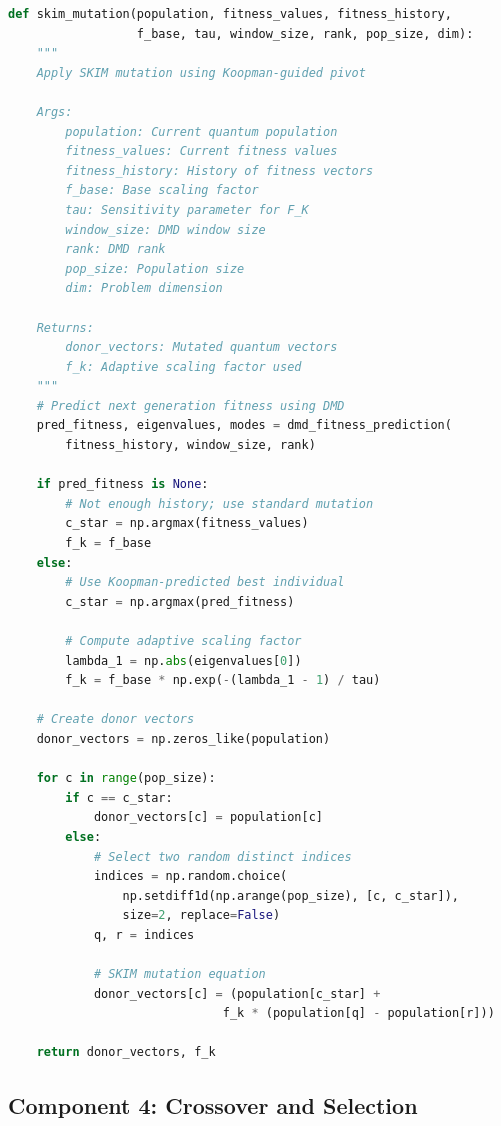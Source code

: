 \documentclass[12pt,a4paper]{article}
\begin{document}
\begin{lstlisting}[language=Python, caption=SKIM Mutation Operator]
def skim_mutation(population, fitness_values, fitness_history,
                  f_base, tau, window_size, rank, pop_size, dim):
    """
    Apply SKIM mutation using Koopman-guided pivot
    
    Args:
        population: Current quantum population
        fitness_values: Current fitness values
        fitness_history: History of fitness vectors
        f_base: Base scaling factor
        tau: Sensitivity parameter for F_K
        window_size: DMD window size
        rank: DMD rank
        pop_size: Population size
        dim: Problem dimension
    
    Returns:
        donor_vectors: Mutated quantum vectors
        f_k: Adaptive scaling factor used
    """
    # Predict next generation fitness using DMD
    pred_fitness, eigenvalues, modes = dmd_fitness_prediction(
        fitness_history, window_size, rank)
    
    if pred_fitness is None:
        # Not enough history; use standard mutation
        c_star = np.argmax(fitness_values)
        f_k = f_base
    else:
        # Use Koopman-predicted best individual
        c_star = np.argmax(pred_fitness)
        
        # Compute adaptive scaling factor
        lambda_1 = np.abs(eigenvalues[0])
        f_k = f_base * np.exp(-(lambda_1 - 1) / tau)
    
    # Create donor vectors
    donor_vectors = np.zeros_like(population)
    
    for c in range(pop_size):
        if c == c_star:
            donor_vectors[c] = population[c]
        else:
            # Select two random distinct indices
            indices = np.random.choice(
                np.setdiff1d(np.arange(pop_size), [c, c_star]),
                size=2, replace=False)
            q, r = indices
            
            # SKIM mutation equation
            donor_vectors[c] = (population[c_star] + 
                              f_k * (population[q] - population[r]))
    
    return donor_vectors, f_k
\end{lstlisting}

\subsection{Component 4: Crossover and Selection}
\end{document}
